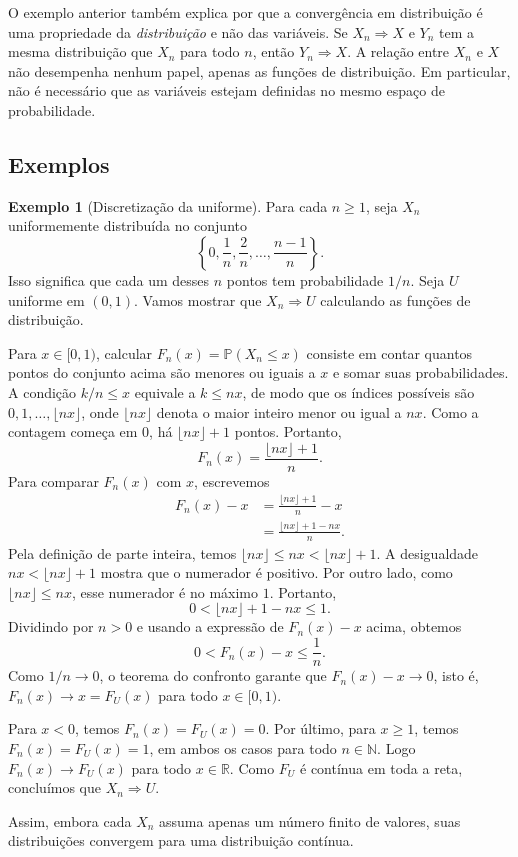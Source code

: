 \documentclass[12pt,portuguese]{article}
\theoremstyle{definition}
\newtheorem{example}[example]{Exemplo}
\theoremstyle{plainexercise}
\theoremstyle{starredexercise}
\theoremstyle{definition}
\begin{document}
O exemplo anterior também explica por que a convergência em distribuição é uma
propriedade da \emph{distribuição} e não das variáveis. Se $X_n\Rightarrow X$ e
$Y_n$ tem a mesma distribuição que $X_n$ para todo $n$, então
$Y_n\Rightarrow X$. A relação entre $X_n$ e $X$ não desempenha nenhum papel,
apenas as funções de distribuição. Em particular, não é necessário que as
variáveis estejam definidas no mesmo espaço de probabilidade.

\subsection{Exemplos}\label{subsec:dist-exemplos}

\begin{example}[Discretização da uniforme]\label{ex:dist-discretizacao}
Para cada $n\geqslant1$, seja $X_n$ uniformemente distribuída no conjunto
\[
\left\{0,\frac{1}{n},\frac{2}{n},\ldots,\frac{n-1}{n}\right\}.
\]
Isso significa que cada um desses $n$ pontos tem probabilidade $1/n$.
Seja $U$ uniforme em $(0,1)$. Vamos mostrar que $X_n\Rightarrow U$ calculando
as funções de distribuição.

Para $x\in[0,1)$, calcular $F_n(x)=\mathbb{P}(X_n\leqslant x)$ consiste em
contar quantos pontos do conjunto acima são menores ou iguais a $x$ e somar
suas probabilidades. A condição $k/n\leqslant x$ equivale a $k\leqslant nx$,
de modo que os índices possíveis são $0,1,\ldots,\lfloor nx\rfloor$, onde
$\lfloor nx\rfloor$ denota o maior inteiro menor ou igual a $nx$.
Como a contagem começa em $0$, há $\lfloor nx\rfloor+1$ pontos. Portanto,
\[
F_n(x)=\frac{\lfloor nx\rfloor+1}{n}.
\]
Para comparar $F_n(x)$ com $x$, escrevemos
\begin{align*}
F_n(x)-x
&=\frac{\lfloor nx\rfloor+1}{n}-x
\\[0.2cm]
&=\frac{\lfloor nx\rfloor+1-nx}{n}.
\end{align*}
Pela definição de parte inteira, temos
$\lfloor nx\rfloor\leqslant nx<\lfloor nx\rfloor+1$.
A desigualdade $nx<\lfloor nx\rfloor+1$ mostra que o numerador é positivo.
Por outro lado, como $\lfloor nx\rfloor\leqslant nx$, esse numerador é no
máximo $1$. Portanto,
\[
0<\lfloor nx\rfloor+1-nx\leqslant1.
\]
Dividindo por $n>0$ e usando a expressão de $F_n(x)-x$ acima, obtemos
\[
0<F_n(x)-x\leqslant\frac{1}{n}.
\]
Como $1/n\to0$, o teorema do confronto garante que $F_n(x)-x\to0$, isto é,
$F_n(x)\to x=F_U(x)$ para todo $x\in[0,1)$.

Para $x<0$, temos $F_n(x)=F_U(x)=0$. Por último, para $x\geqslant1$, temos
$F_n(x)=F_U(x)=1$, em ambos os casos para todo $n\in\mathbb{N}$.
Logo $F_n(x)\to F_U(x)$ para todo $x\in\mathbb{R}$. Como $F_U$ é contínua
em toda a reta, concluímos que $X_n\Rightarrow U$.

Assim, embora cada $X_n$ assuma apenas um número finito de valores, suas
distribuições convergem para uma distribuição contínua.
\end{example}
\end{document}
